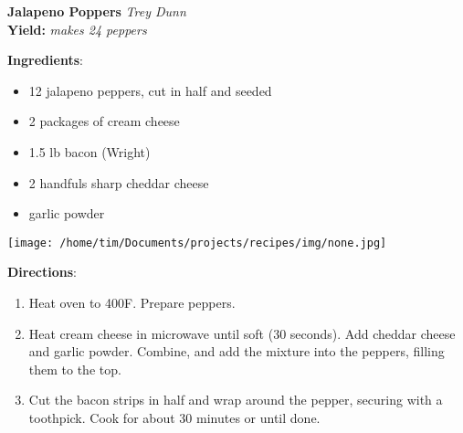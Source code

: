 \documentclass[11pt, twoside, openany]{book}
\begin{document}
\noindent\begin{minipage}[t]{\linewidth}%
{\Large\textbf{Jalapeno Poppers}} \label{jalapeno-poppers}\hfill\textit{Trey Dunn}\\
\textbf{Yield:} \textit{makes 24 peppers}\\
\noindent\begin{minipage}[t]{0.78\linewidth}%
\textbf{Ingredients}:\vspace{-3mm}
\begin{multicols}{2}
\begin{itemize}\setlength\itemsep{-1mm}
\item 12 jalapeno peppers, cut in half and seeded
\item 2 packages of cream cheese
\item 1.5 lb bacon (Wright)
\item 2 handfuls sharp cheddar cheese
\item garlic powder
\end{itemize}
\end{multicols}
\end{minipage}
\noindent\begin{minipage}[t]{0.18\linewidth}
\centering \strut\vspace*{-\baselineskip}\newline
\texttt{[image: /home/tim/Documents/projects/recipes/img/none.jpg]}\\
\end{minipage}\vspace{3mm}
\textbf{Directions}:
\vspace{-3mm}\begin{enumerate}\setlength\itemsep{-1mm}
\item Heat oven to 400F. Prepare peppers.
\item Heat cream cheese in microwave until soft (30 seconds). Add cheddar cheese and garlic powder. Combine, and add the mixture into the peppers, filling them to the top.
\item Cut the bacon strips in half and wrap around the pepper, securing with a toothpick. Cook for about 30 minutes or until done.
\end{enumerate}
\end{minipage}\vspace{8mm}
\end{document}
